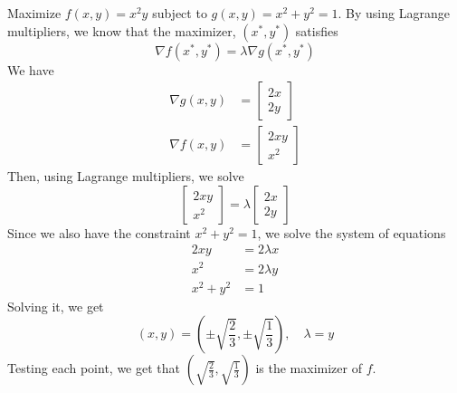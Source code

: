 \begin{problem}
  Maximize $f(x,y) = x^2 y$ subject to $g(x,y) = x^2 + y^2 = 1$. By using Lagrange multipliers, we know that the maximizer, $(x^*, y^*)$ satisfies $$\nabla f(x^*, y^*) = \lambda \nabla g(x^*, y^*)$$ We have 
  \begin{align*}
    \nabla g(x,y) &= \begin{bmatrix} 2x \\ 2y \end{bmatrix} \\
    \nabla f(x,y) &= \begin{bmatrix} 2xy \\ x^2 \end{bmatrix}
  \end{align*} Then, using Lagrange multipliers, we solve
  $$\begin{bmatrix} 2xy \\ x^{2} \end{bmatrix} = \lambda \begin{bmatrix} 2x \\ 2y \end{bmatrix}$$ Since we also have the constraint $x^2 + y^2 = 1$, we solve the system of equations
  \begin{align*}
    2xy &= 2\lambda x \\
    x^2 &= 2\lambda y \\
    x^2 + y^2 &= 1
  \end{align*}
  Solving it, we get $$(x, y) = \left(\pm \sqrt{\frac{2}{3}}, \pm \sqrt{\frac{1}{3}}\right), \quad \lambda = y$$
  Testing each point, we get that $\left(\sqrt{\frac{2}{3}}, \sqrt{\frac{1}{3}}\right)$ is the maximizer of $f$.
\end{problem}

